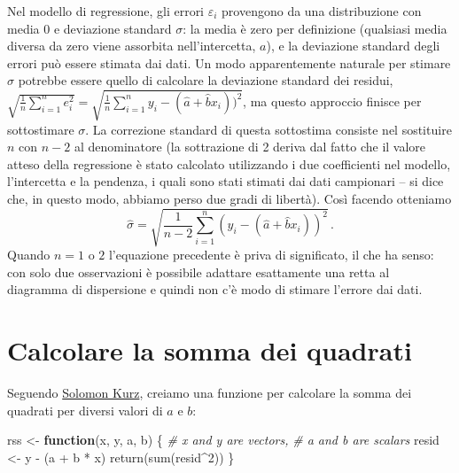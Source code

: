 \documentclass[
  10pt,
  italian,
  a4paper,
  extrafontsizes,onecolumn,openright
  ]{memoir}
\newenvironment{Shaded}{\begin{snugshade}}{\end{snugshade}}
\newcommand{\CommentTok}[1]{\textcolor[rgb]{0.56,0.35,0.01}{\textit{#1}}}
\newcommand{\ControlFlowTok}[1]{\textcolor[rgb]{0.13,0.29,0.53}{\textbf{#1}}}
\newcommand{\DecValTok}[1]{\textcolor[rgb]{0.00,0.00,0.81}{#1}}
\newcommand{\FunctionTok}[1]{\textcolor[rgb]{0.00,0.00,0.00}{#1}}
\newcommand{\NormalTok}[1]{#1}
\newcommand{\OtherTok}[1]{\textcolor[rgb]{0.56,0.35,0.01}{#1}}
\newcommand{\SpecialCharTok}[1]{\textcolor[rgb]{0.00,0.00,0.00}{#1}}
\begin{document}
Nel modello di regressione, gli errori \(\varepsilon_i\) provengono da una distribuzione con media 0 e deviazione standard \(\sigma\): la media è zero per definizione (qualsiasi media diversa da zero viene assorbita nell'intercetta, \(a\)), e la deviazione standard degli errori può essere stimata dai dati. Un modo apparentemente naturale per stimare \(\sigma\) potrebbe essere quello di calcolare la deviazione standard dei residui, \(\sqrt{\frac{1}{n} \sum_{i=1}^n e_i^2} = \sqrt{ \frac{1}{n} \sum_{i=1}^n y_i - (\hat{a} + \hat{b} x_i))^2}\), ma questo approccio finisce per sottostimare \(\sigma\).
La correzione standard di questa sottostima consiste nel sostituire \(n\) con \(n - 2\) al denominatore (la sottrazione di 2 deriva dal fatto che il valore atteso della regressione è stato calcolato utilizzando i due coefficienti nel modello, l'intercetta e la pendenza, i quali sono stati stimati dai dati campionari -- si dice che, in questo modo, abbiamo perso due gradi di libertà). Così facendo otteniamo
\begin{equation}
\hat{\sigma} = \sqrt{\frac{1}{n-2} \sum_{i=1}^n (y_i - (\hat{a} + \hat{b} x_i))^2}\,.
\end{equation}
Quando \(n = 1\) o \(2\) l'equazione precedente è priva di significato, il che ha senso: con solo due osservazioni è possibile adattare esattamente una retta al diagramma di dispersione e quindi non c'è modo di stimare l'errore dai dati.

\hypertarget{calcolare-la-somma-dei-quadrati}{%
\section{Calcolare la somma dei quadrati}\label{calcolare-la-somma-dei-quadrati}}

Seguendo \href{https://github.com/ASKurz/Working-through-Regression-and-other-stories/blob/main/08.Rmd}{Solomon Kurz}, creiamo una funzione per calcolare la somma dei quadrati per diversi valori di \(a\) e \(b\):

\begin{Shaded}
\begin{Highlighting}[]
\NormalTok{rss }\OtherTok{\textless{}{-}} \ControlFlowTok{function}\NormalTok{(x, y, a, b) \{  }
  \CommentTok{\# x and y are vectors, }
  \CommentTok{\# a and b are scalars }
\NormalTok{  resid }\OtherTok{\textless{}{-}}\NormalTok{ y }\SpecialCharTok{{-}}\NormalTok{ (a }\SpecialCharTok{+}\NormalTok{ b }\SpecialCharTok{*}\NormalTok{ x)}
  \FunctionTok{return}\NormalTok{(}\FunctionTok{sum}\NormalTok{(resid}\SpecialCharTok{\^{}}\DecValTok{2}\NormalTok{))}
\NormalTok{  \}}
\end{Highlighting}
\end{Shaded}
\end{document}
